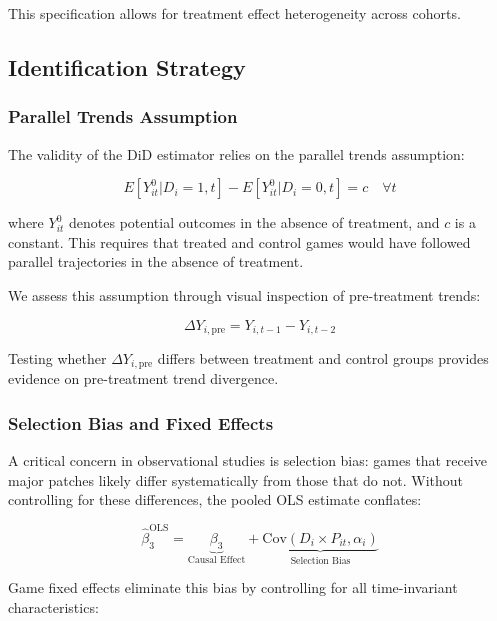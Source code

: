 \documentclass[12pt,a4paper]{article}
\begin{document}
This specification allows for treatment effect heterogeneity across cohorts.

\subsection{Identification Strategy}

\subsubsection{Parallel Trends Assumption}

The validity of the DiD estimator relies on the parallel trends assumption:

\begin{equation}
E[Y_{it}^0 | D_i = 1, t] - E[Y_{it}^0 | D_i = 0, t] = c \quad \forall t
\label{eq:parallel_trends}
\end{equation}

where $Y_{it}^0$ denotes potential outcomes in the absence of treatment, and $c$ is a constant. This requires that treated and control games would have followed parallel trajectories in the absence of treatment.

We assess this assumption through visual inspection of pre-treatment trends:

\begin{equation}
\Delta Y_{i, \text{pre}} = Y_{i,t-1} - Y_{i,t-2}
\end{equation}

Testing whether $\Delta Y_{i, \text{pre}}$ differs between treatment and control groups provides evidence on pre-treatment trend divergence.

\subsubsection{Selection Bias and Fixed Effects}

A critical concern in observational studies is selection bias: games that receive major patches likely differ systematically from those that do not. Without controlling for these differences, the pooled OLS estimate conflates:

\begin{equation}
\hat{\beta}_3^{\text{OLS}} = \underbrace{\beta_3}_{\text{Causal Effect}} + \underbrace{\text{Cov}(D_i \times P_{it}, \alpha_i)}_{\text{Selection Bias}}
\end{equation}

Game fixed effects eliminate this bias by controlling for all time-invariant characteristics:
\end{document}
